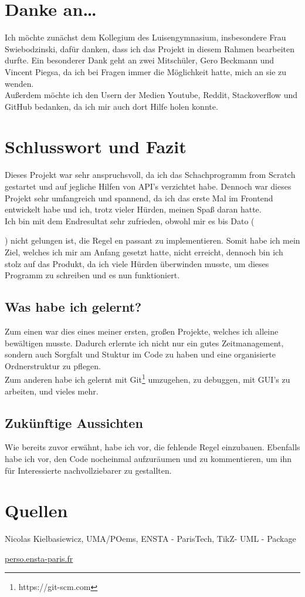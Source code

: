 \documentclass[a4paper, 10pt]{scrartcl}
\begin{document}
\section{Danke an\dots{}}
Ich möchte zunächst dem  Kollegium des Luisengymnasium, insbesondere Frau
Swiebodzinski, dafür danken, dass ich das Projekt in diesem Rahmen bearbeiten durfte. 
Ein besonderer Dank geht an zwei Mitschüler, Gero Beckmann und Vincent Piegsa, da ich
bei Fragen immer die Möglichkeit hatte, mich an sie zu wenden.\\
Außerdem möchte ich den Usern der Medien Youtube, Reddit, Stackoverflow und GitHub bedanken,
da ich mir auch dort Hilfe holen konnte. 

\section{Schlusswort und Fazit}
Dieses Projekt war sehr anspruchsvoll, da ich das Schachprogramm \glqq from Scratch\grqq{}
gestartet und auf jegliche Hilfen von API's verzichtet habe. Dennoch war dieses Projekt
sehr umfangreich und spannend, da ich das erste Mal im Frontend entwickelt habe und ich,
trotz vieler Hürden, meinen Spaß daran hatte. \\
Ich bin mit dem Endresultat sehr zufrieden, obwohl mir es bis Dato (\date{}) 
nicht gelungen ist, die Regel \glqq en passant\grqq{} zu implementieren.
Somit habe ich mein Ziel, welches ich mir am Anfang gesetzt hatte, nicht
erreicht, dennoch bin ich stolz auf das Produkt, da ich viele Hürden überwinden musste, um
dieses Programm zu schreiben und es nun funktioniert. 

\subsection{Was habe ich gelernt?}
Zum einen war dies eines meiner ersten, großen Projekte, welches
ich alleine bewältigen musste. Dadurch erlernte ich nicht nur ein gutes Zeitmanagement, sondern auch
Sorgfalt und Stuktur im Code zu haben und eine organisierte Ordnerstruktur zu pflegen.\\
Zum anderen habe ich gelernt mit Git\footnote{https://git-scm.com} umzugehen, zu debuggen, mit GUI's zu arbeiten,
und vieles mehr.

\subsection{Zukünftige Aussichten}
Wie bereits zuvor erwähnt, habe ich vor, die fehlende Regel einzubauen. Ebenfalls habe ich vor,
den Code nocheinmal aufzuräumen und zu kommentieren, um ihn für Interessierte nachvollziebarer
zu gestallten. 

\pagebreak
\section{Quellen}
Nicolas Kielbasiewicz, UMA/POems, ENSTA - ParisTech, TikZ- UML - Package

\href{https://perso.ensta-paris.fr/~kielbasi/tikzuml/}{perso.ensta-paris.fr}

\printbibliography
\end{document}
